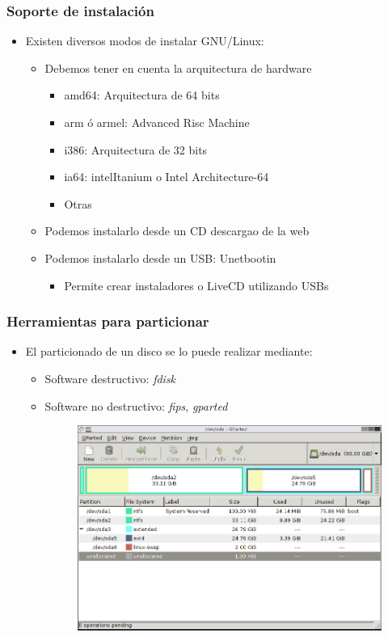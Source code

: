 \begin{frame}
  \frametitle{Soporte de instalación}
  \begin{itemize}
	  \item Existen diversos modos de instalar GNU/Linux:
	  \begin{itemize}
	  	\item Debemos tener en cuenta la arquitectura de hardware
	  	\begin{itemize}
		  	\item amd64: Arquitectura de 64 bits
		  	\item arm ó armel: Advanced Risc Machine
		  	\item i386: Arquitectura de 32 bits
		  	\item ia64: intelItanium o Intel Architecture-64
		  	\item Otras
	  	\end{itemize}
	  	\item Podemos instalarlo desde un CD descargao de la web
	  	\item Podemos instalarlo desde un USB: Unetbootin
	  	\begin{itemize}
	  		\item Permite crear instaladores o LiveCD utilizando USBs
	  	\end{itemize}
	  \end{itemize}
  \end{itemize}
\end{frame}

\begin{frame}
  \frametitle{Herramientas para particionar}
  \begin{itemize}
	  \item El particionado de un disco se lo puede realizar mediante:
	  \begin{itemize}
	  	\item Software destructivo: \textit{fdisk}
	  	\item Software no destructivo: \textit{fips}, \textit{gparted}
		\begin{figure}
		    \includegraphics[scale=0.3]{images/gparted.png}
		\end{figure}
	  \end{itemize}
  \end{itemize}
\end{frame}


